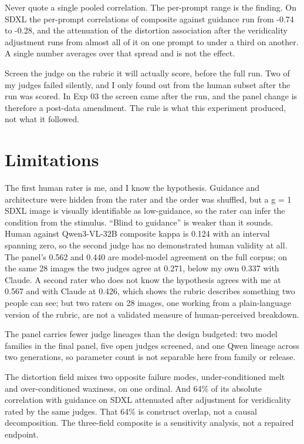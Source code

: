 \documentclass[11pt]{article}
\begin{document}
Never quote a single pooled correlation. The per-prompt range is the finding. On
SDXL the per-prompt correlations of composite against guidance run from -0.74 to
-0.28, and the attenuation of the distortion association after the veridicality
adjustment runs from almost all of it on one prompt to under a third on another.
A single number averages over that spread and is not the effect.

Screen the judge on the rubric it will actually score, before the full run. Two
of my judges failed silently, and I only found out from the human subset after
the run was scored. In Exp 03 the screen came after the run, and the panel
change is therefore a post-data amendment. The rule is what this experiment
produced, not what it followed.

\section{Limitations}\label{limitations}

The first human rater is me, and I know the hypothesis. Guidance and
architecture were hidden from the rater and the order was shuffled, but a g = 1
SDXL image is visually identifiable as low-guidance, so the rater can infer the
condition from the stimulus. ``Blind to guidance'' is weaker than it sounds.
Human against Qwen3-VL-32B composite kappa is 0.124 with an interval spanning
zero, so the second judge has no demonstrated human validity at all. The panel's
0.562 and 0.440 are model-model agreement on the full corpus; on the same 28
images the two judges agree at 0.271, below my own 0.337 with Claude. A second
rater who does not know the hypothesis agrees with me at 0.567 and with Claude
at 0.426, which shows the rubric describes something two people can see; but two
raters on 28 images, one working from a plain-language version of the rubric,
are not a validated measure of human-perceived breakdown.

The panel carries fewer judge lineages than the design budgeted: two model
families in the final panel, five open judges screened, and one Qwen lineage
across two generations, so parameter count is not separable here from family or
release.

The distortion field mixes two opposite failure modes, under-conditioned melt
and over-conditioned waxiness, on one ordinal. And 64\% of its absolute
correlation with guidance on SDXL attenuated after adjustment for veridicality
rated by the same judges. That 64\% is construct overlap, not a causal
decomposition. The three-field composite is a sensitivity analysis, not a
repaired endpoint.
\end{document}
